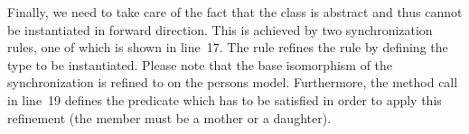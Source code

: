 Finally, we need to take care of the fact that the class  is abstract and thus cannot be instantiated in forward direction. This is achieved by two synchronization rules, one of which is shown in line~17. The rule  refines the rule  by defining the type to be instantiated. Please note that the base isomorphism of the synchronization is refined to  on the persons model. Furthermore, the method call in line~19 defines the predicate which has to be satisfied in order to apply this refinement (the member must be a mother or a daughter).  

